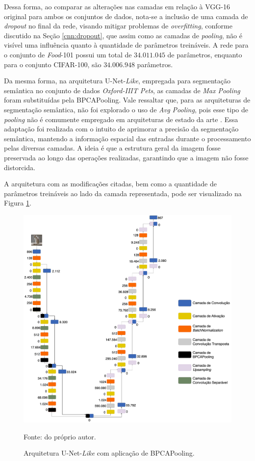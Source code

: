 Dessa forma, ao comparar as alterações nas camadas em relação à VGG-16 original para ambos os conjuntos de dados, nota-se a inclusão de uma camada de \textit{dropout} no final da rede, visando mitigar problemas de \textit{overfitting}, conforme discutido na Seção \ref{cnn:dropout}, que assim como as camadas de \textit{pooling}, não é visível uma influência quanto à quantidade de parâmetros treináveis. A rede para o conjunto de \textit{Food}-101 possui um total de $34.011.045$ de parâmetros, enquanto para o conjunto CIFAR-100, são $34.006.948$ parâmetros.

Da mesma forma, na arquitetura U-Net-\textit{Like}, empregada para segmentação semântica no conjunto de dados \textit{Oxford-IIIT Pets}, as camadas de \textit{Max Pooling} foram substituídas pela BPCAPooling. Vale ressaltar que, para as arquiteturas de segmentação semântica, não foi explorado o uso de \textit{Avg Pooling}, pois esse tipo de \textit{pooling} não é comumente empregado em arquiteturas de estado da arte \citep{Ronneberger2015U-net:Segmentation,Kugelman2022ASegmentation}. Essa adaptação foi realizada com o intuito de aprimorar a precisão da segmentação semântica, mantendo a informação espacial das entradas durante o processamento pelas diversas camadas. A ideia é que a estrutura geral da imagem fosse preservada ao longo das operações realizadas, garantindo que a imagem não fosse distorcida.

A arquitetura com as modificações citadas, bem como a quantidade de parâmetros treináveis ao lado da camada representada, pode ser visualizado na Figura \ref{project:fig:change_pooling:unet-like}.

\begin{figure}[H]
    \centering
    \caption{Arquitetura U-Net-\textit{Like} com aplicação de BPCAPooling.}
    \includegraphics[width=1\textwidth]{recursos/imagens/project/unet-like-with-bpca-food.png}
    \label{project:fig:change_pooling:unet-like}

    Fonte: do próprio autor.
\end{figure}

